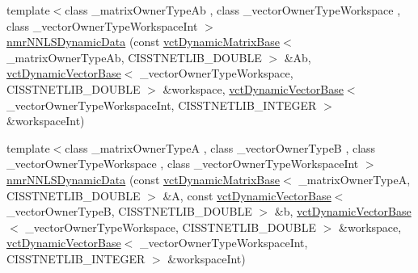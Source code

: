 {\bf }\par
\begin{DoxyCompactItemize}
\item 
{\footnotesize template$<$class \+\_\+matrix\+Owner\+Type\+Ab , class \+\_\+vector\+Owner\+Type\+Workspace , class \+\_\+vector\+Owner\+Type\+Workspace\+Int $>$ }\\\hyperlink{classnmr_n_n_l_s_dynamic_data_a01fdee60583ad42b751200b63afa2831}{nmr\+N\+N\+L\+S\+Dynamic\+Data} (const \hyperlink{classvct_dynamic_matrix_base}{vct\+Dynamic\+Matrix\+Base}$<$ \+\_\+matrix\+Owner\+Type\+Ab, C\+I\+S\+S\+T\+N\+E\+T\+L\+I\+B\+\_\+\+D\+O\+U\+B\+L\+E $>$ \&Ab, \hyperlink{classvct_dynamic_vector_base}{vct\+Dynamic\+Vector\+Base}$<$ \+\_\+vector\+Owner\+Type\+Workspace, C\+I\+S\+S\+T\+N\+E\+T\+L\+I\+B\+\_\+\+D\+O\+U\+B\+L\+E $>$ \&workspace, \hyperlink{classvct_dynamic_vector_base}{vct\+Dynamic\+Vector\+Base}$<$ \+\_\+vector\+Owner\+Type\+Workspace\+Int, C\+I\+S\+S\+T\+N\+E\+T\+L\+I\+B\+\_\+\+I\+N\+T\+E\+G\+E\+R $>$ \&workspace\+Int)
\item 
{\footnotesize template$<$class \+\_\+matrix\+Owner\+Type\+A , class \+\_\+vector\+Owner\+Type\+B , class \+\_\+vector\+Owner\+Type\+Workspace , class \+\_\+vector\+Owner\+Type\+Workspace\+Int $>$ }\\\hyperlink{classnmr_n_n_l_s_dynamic_data_a906564c7fe53d1ff270d30252892b47d}{nmr\+N\+N\+L\+S\+Dynamic\+Data} (const \hyperlink{classvct_dynamic_matrix_base}{vct\+Dynamic\+Matrix\+Base}$<$ \+\_\+matrix\+Owner\+Type\+A, C\+I\+S\+S\+T\+N\+E\+T\+L\+I\+B\+\_\+\+D\+O\+U\+B\+L\+E $>$ \&A, const \hyperlink{classvct_dynamic_vector_base}{vct\+Dynamic\+Vector\+Base}$<$ \+\_\+vector\+Owner\+Type\+B, C\+I\+S\+S\+T\+N\+E\+T\+L\+I\+B\+\_\+\+D\+O\+U\+B\+L\+E $>$ \&b, \hyperlink{classvct_dynamic_vector_base}{vct\+Dynamic\+Vector\+Base}$<$ \+\_\+vector\+Owner\+Type\+Workspace, C\+I\+S\+S\+T\+N\+E\+T\+L\+I\+B\+\_\+\+D\+O\+U\+B\+L\+E $>$ \&workspace, \hyperlink{classvct_dynamic_vector_base}{vct\+Dynamic\+Vector\+Base}$<$ \+\_\+vector\+Owner\+Type\+Workspace\+Int, C\+I\+S\+S\+T\+N\+E\+T\+L\+I\+B\+\_\+\+I\+N\+T\+E\+G\+E\+R $>$ \&workspace\+Int)
\end{DoxyCompactItemize}

